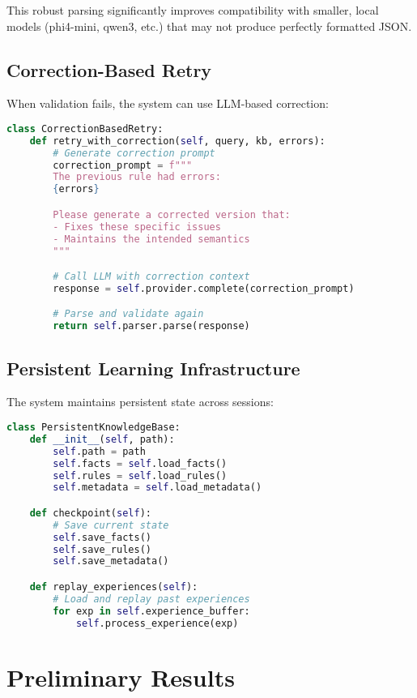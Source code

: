 \documentclass[10pt,conference]{IEEEtran}
\begin{document}
This robust parsing significantly improves compatibility with smaller, local models (phi4-mini, qwen3, etc.) that may not produce perfectly formatted JSON.

\subsection{Correction-Based Retry}

When validation fails, the system can use LLM-based correction:

\begin{lstlisting}[language=Python]
class CorrectionBasedRetry:
    def retry_with_correction(self, query, kb, errors):
        # Generate correction prompt
        correction_prompt = f"""
        The previous rule had errors:
        {errors}

        Please generate a corrected version that:
        - Fixes these specific issues
        - Maintains the intended semantics
        """

        # Call LLM with correction context
        response = self.provider.complete(correction_prompt)

        # Parse and validate again
        return self.parser.parse(response)
\end{lstlisting}

\subsection{Persistent Learning Infrastructure}

The system maintains persistent state across sessions:

\begin{lstlisting}[language=Python]
class PersistentKnowledgeBase:
    def __init__(self, path):
        self.path = path
        self.facts = self.load_facts()
        self.rules = self.load_rules()
        self.metadata = self.load_metadata()

    def checkpoint(self):
        # Save current state
        self.save_facts()
        self.save_rules()
        self.save_metadata()

    def replay_experiences(self):
        # Load and replay past experiences
        for exp in self.experience_buffer:
            self.process_experience(exp)
\end{lstlisting}

\section{Preliminary Results}
\end{document}
